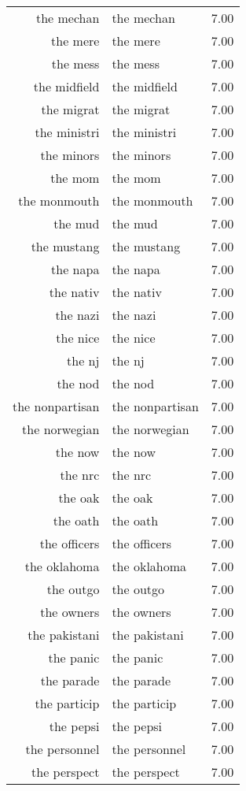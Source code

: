 \begin{table}[ht]
\begin{tabular}{rlr}
  the mechan & the mechan & 7.00 \\ 
  the mere & the mere & 7.00 \\ 
  the mess & the mess & 7.00 \\ 
  the midfield & the midfield & 7.00 \\ 
  the migrat & the migrat & 7.00 \\ 
  the ministri & the ministri & 7.00 \\ 
  the minors & the minors & 7.00 \\ 
  the mom & the mom & 7.00 \\ 
  the monmouth & the monmouth & 7.00 \\ 
  the mud & the mud & 7.00 \\ 
  the mustang & the mustang & 7.00 \\ 
  the napa & the napa & 7.00 \\ 
  the nativ & the nativ & 7.00 \\ 
  the nazi & the nazi & 7.00 \\ 
  the nice & the nice & 7.00 \\ 
  the nj & the nj & 7.00 \\ 
  the nod & the nod & 7.00 \\ 
  the nonpartisan & the nonpartisan & 7.00 \\ 
  the norwegian & the norwegian & 7.00 \\ 
  the now & the now & 7.00 \\ 
  the nrc & the nrc & 7.00 \\ 
  the oak & the oak & 7.00 \\ 
  the oath & the oath & 7.00 \\ 
  the officers & the officers & 7.00 \\ 
  the oklahoma & the oklahoma & 7.00 \\ 
  the outgo & the outgo & 7.00 \\ 
  the owners & the owners & 7.00 \\ 
  the pakistani & the pakistani & 7.00 \\ 
  the panic & the panic & 7.00 \\ 
  the parade & the parade & 7.00 \\ 
  the particip & the particip & 7.00 \\ 
  the pepsi & the pepsi & 7.00 \\ 
  the personnel & the personnel & 7.00 \\ 
  the perspect & the perspect & 7.00 \\ 

\end{tabular}
\end{table}
